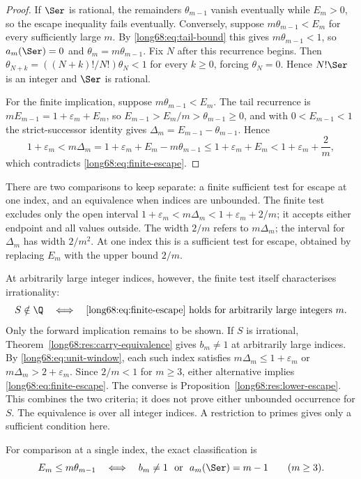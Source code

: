 \begin{proof}
If $\Ser$ is rational, the remainders $\theta_{m-1}$ vanish eventually while
$E_m>0$, so the escape inequality fails eventually.  Conversely, suppose
$m\theta_{m-1}<E_m$ for every sufficiently large $m$.  By
\eqref{long68:eq:tail-bound} this gives $m\theta_{m-1}<1$, so $a_m(\Ser)=0$ and
$\theta_m=m\theta_{m-1}$. Fix $N$ after this recurrence begins.
Then $\theta_{N+k}=((N+k)!/N!)\theta_N<1$ for every $k\ge0$, forcing
$\theta_N=0$. Hence $N!\Ser$ is an integer and $\Ser$ is rational.

For the finite implication, suppose $m\theta_{m-1}<E_m$.  The tail recurrence
is $mE_{m-1}=1+\varepsilon_m+E_m$, so $E_{m-1}>E_m/m>\theta_{m-1}\ge0$, and
with $0<E_{m-1}<1$ the strict-successor identity gives
$\Delta_m=E_{m-1}-\theta_{m-1}$.  Hence
\[
 1+\varepsilon_m<m\Delta_m=1+\varepsilon_m+E_m-m\theta_{m-1}
 \le1+\varepsilon_m+E_m<1+\varepsilon_m+\frac2m,
\]
which contradicts \eqref{long68:eq:finite-escape}.
\end{proof}

There are two comparisons to keep separate: a finite sufficient test
for escape at one index, and an equivalence when indices are unbounded.
The finite test excludes only the open interval
$1+\varepsilon_m<m\Delta_m<1+\varepsilon_m+2/m$; it accepts either endpoint
and all values outside. The width $2/m$ refers to $m\Delta_m$; the interval
for $\Delta_m$ has width $2/m^2$. At one index this is a sufficient test
for escape, obtained by replacing $E_m$ with the upper bound $2/m$.

At arbitrarily large integer indices, however, the finite test itself
characterises irrationality:
\[
 S\notin\Q\quad\Longleftrightarrow\quad
 \text{\eqref{long68:eq:finite-escape} holds for arbitrarily large integers }m.
\]
Only the forward implication remains to be shown. If $S$ is irrational,
Theorem~\ref{long68:res:carry-equivalence} gives $b_m\ne1$ at arbitrarily
large indices. By \eqref{long68:eq:unit-window}, each such index satisfies
$m\Delta_m\le1+\varepsilon_m$ or $m\Delta_m>2+\varepsilon_m$.
Since $2/m<1$ for $m\ge3$, either alternative implies
\eqref{long68:eq:finite-escape}. The converse is Proposition~\ref{long68:res:lower-escape}.
This combines the two criteria; it does not prove either unbounded
occurrence for $S$. The equivalence is over all integer indices. A
restriction to primes gives only a sufficient condition here.

For comparison at a single index, the exact classification is
\begin{equation}\label{long68:eq:escape-classification}
 E_m\le m\theta_{m-1}
 \quad\Longleftrightarrow\quad
 b_m\ne1\ \hbox{ or }\ a_m(\Ser)=m-1
 \qquad(m\ge3).
\end{equation}

